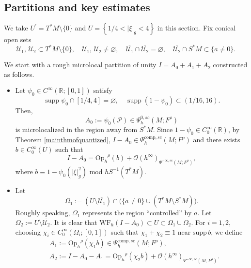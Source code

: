 \documentclass[11pt,oneside,reqno]{amsart}
\newcommand\R{\ensuremath{\mathbb{R}}}
\newcommand\Oph{\ensuremath{\mathrm{Op}_h}}
\theoremstyle{definition}
\numberwithin{equation}{section}
\theoremstyle{plain}
\begin{document}
\subsection{Partitions and key estimates}
We take $U^{\prime}=T^*M\setminus \{0\}$ and $U=\left\{1/4<|\xi|_g<4\right\}$ in this section. Fix conical open sets
\begin{equation*}
    \mathcal{U}_1, \,\mathcal{U}_2 \subset T^* M \setminus \{0\}, \quad \mathcal{U}_1, \,\mathcal{U}_2 \neq \varnothing, \quad \overline{\mathcal{U}_1} \cap \overline{\mathcal{U}_2}=\varnothing, \quad \overline{\mathcal{U}_2} \cap S^* M \subset \{a \not= 0\}.
\end{equation*}

We start with a rough microlocal partition of unity $I=A_0+A_1+A_2$ constructed as follows. 
\begin{itemize}
    \item Let $\psi_0 \in C^{\infty}(\mathbb{R};[0,1])$ satisfy
\begin{equation}\label{cutofffunctioninproof}
\operatorname{supp} \psi_0 \cap [1/4,4]=\varnothing, \quad \operatorname{supp}\left(1-\psi_0\right) \subset(1 / 16,16).
\end{equation}
Then,
\begin{equation}
    A_{0}:=\psi_{0}(\mathcal{P}) \in \Psi^{0,sc}_h(M;F^\rho)
\end{equation}
is microlocalized in the region away from $S^* M$. Since $1-\psi_0\in C_{0}^{\infty}(\R)$, by Theorem \ref{mainthmofquantized}, $I-A_0\in \Psi^{\mathrm{comp},sc}_h(M;F^\rho)$ and there exists $b \in C_{0}^{\infty}(U)$ such that
\begin{equation}
I-A_0=\Oph^{\rho}(b)+\mathcal{O}(h^\infty)_{\Psi^{-\infty,sc}(M;F^\rho)},
\end{equation}
where $b\equiv 1-\psi_{0}(|\xi|^2_g)$ mod $hS^{-1}(T^*M)$.
\item Let 
\begin{equation}
    \Omega_1:=(U \setminus \overline{\mathcal{U}_1}) \cap \big(\{a \not= 0\} \cup (T^* M \setminus S^* M ) \big).
\end{equation}
Roughly speaking, $\Omega_{1}$ represents the region ``controlled'' by $a$. Let $\Omega_2:=U \setminus \overline{\mathcal{U}_2}$. It is clear that $\mathrm{WF}_h(I-A_0)\subset U \subset\Omega_1 \cup \Omega_2$. For $i=1,2$, choosing $\chi_{i} \in C_{0}^{\infty}(\Omega_i;[0,1])$ such that $\chi_{1}+\chi_{2} \equiv 1$ near $\mathrm{supp}\,b$, we define
\begin{equation}
\begin{aligned}
    &A_{1}:=\Oph^{\rho}(\chi_{1}b) \in \Psi^{\mathrm{comp},sc}_h(M;F^\rho), \\
    &A_{2}:=I-A_{0}-A_1=\Oph^{\rho}(\chi_{2}b)+\mathcal{O}(h^\infty)_{\Psi^{-\infty,sc}(M;F^\rho)}.
\end{aligned}
\end{equation}
\end{itemize}
\end{document}
